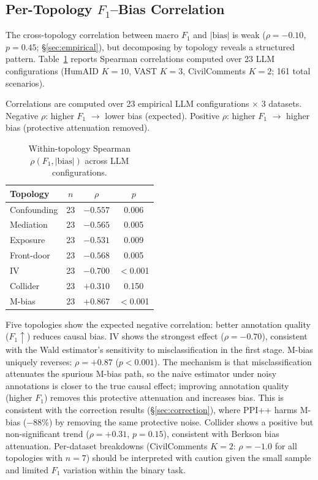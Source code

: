 \subsection{Per-Topology $F_1$--Bias Correlation}
\label{sec:within_topo_f1}

The cross-topology correlation between macro $F_1$ and $|\text{bias}|$ is weak ($\rho = -0.10$, $p = 0.45$; \S\ref{sec:empirical}), but decomposing by topology reveals a structured pattern. Table~\ref{tab:within_topo_f1} reports Spearman correlations computed over 23 LLM configurations (HumAID $K{=}10$, VAST $K{=}3$, CivilComments $K{=}2$; 161 total scenarios).

Correlations are computed over 23 empirical LLM configurations $\times$ 3 datasets. Negative $\rho$: higher $F_1$ $\to$ lower bias (expected). Positive $\rho$: higher $F_1$ $\to$ higher bias (protective attenuation removed).

\begin{table}[H]
\centering
\small
\caption{Within-topology Spearman $\rho(F_1, |\text{bias}|)$ across LLM configurations.}
\label{tab:within_topo_f1}
\begin{tabular}{lccc}
\toprule
\textbf{Topology} & $n$ & $\rho$ & $p$ \\
\midrule
Confounding & 23 & $-0.557$ & 0.006 \\
Mediation & 23 & $-0.565$ & 0.005 \\
Exposure & 23 & $-0.531$ & 0.009 \\
Front-door & 23 & $-0.568$ & 0.005 \\
IV & 23 & $-0.700$ & $<$0.001 \\
Collider & 23 & $+0.310$ & 0.150 \\
M-bias & 23 & $+0.867$ & $<$0.001 \\
\bottomrule
\end{tabular}
\end{table}

Five topologies show the expected negative correlation: better annotation quality ($F_1{\uparrow}$) reduces causal bias. IV shows the strongest effect ($\rho = -0.70$), consistent with the Wald estimator's sensitivity to misclassification in the first stage. M-bias uniquely reverses: $\rho = +0.87$ ($p < 0.001$). The mechanism is that misclassification attenuates the spurious M-bias path, so the naive estimator under noisy annotations is closer to the true causal effect; improving annotation quality (higher $F_1$) removes this protective attenuation and increases bias. This is consistent with the correction results (\S\ref{sec:correction}), where PPI++ harms M-bias ($-$88\%) by removing the same protective noise. Collider shows a positive but non-significant trend ($\rho = +0.31$, $p = 0.15$), consistent with Berkson bias attenuation. Per-dataset breakdowns (CivilComments $K{=}2$: $\rho = -1.0$ for all topologies with $n{=}7$) should be interpreted with caution given the small sample and limited $F_1$ variation within the binary task.

